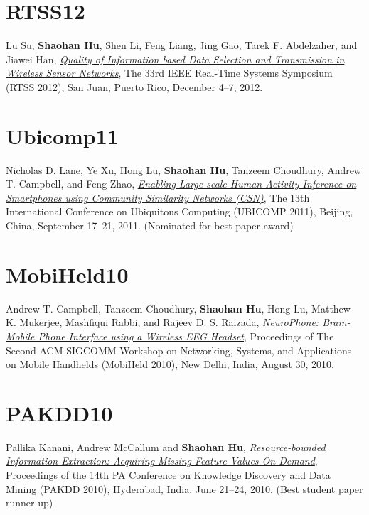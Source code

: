 \section{\sc RTSS12}\hypertarget{su2012rtss}{}
Lu Su, \textbf{Shaohan Hu}, Shen Li, Feng Liang, Jing Gao, Tarek
F. Abdelzaher, and Jiawei Han, \href{http://ieeexplore.ieee.org/xpl/articleDetails.jsp?arnumber=6424815}{\emph{Quality of Information based Data
  Selection and Transmission in Wireless Sensor Networks}}, \textsf{The
  33rd IEEE Real-Time Systems Symposium (RTSS 2012)}, San Juan, Puerto
Rico, December 4--7, 2012.

\section{\sc Ubicomp11}\hypertarget{lane2011ubicomp}{}
Nicholas D. Lane, Ye Xu, Hong Lu, \textbf{Shaohan Hu}, Tanzeem
Choudhury, Andrew T. Campbell, and Feng Zhao, \href{http://portal.acm.org/citation.cfm?id=2030160}{\emph{Enabling
  Large-scale Human Activity Inference on Smartphones using Community
  Similarity Networks (CSN)}}, \textsf{The 13th International
  Conference on Ubiquitous Computing (UBICOMP 2011)}, Beijing, China,
September 17--21, 2011. (Nominated for best paper award)

\section{\sc MobiHeld10}\hypertarget{campbell2010mobiheld}{}
Andrew T. Campbell, Tanzeem Choudhury, \textbf{Shaohan Hu}, Hong Lu,
Matthew K. Mukerjee, Mashfiqui Rabbi, and Rajeev D. S. Raizada,
\href{http://portal.acm.org/citation.cfm?id=1851326}{\emph{NeuroPhone: Brain-Mobile Phone Interface using a Wireless EEG
  Headset}}, \textsf{Proceedings of The Second ACM SIGCOMM Workshop on
  Networking, Systems, and Applications on Mobile Handhelds (MobiHeld
  2010)}, New Delhi, India, August 30, 2010.

\section{\sc PAKDD10}\hypertarget{kanani2010pakdd}{}
Pallika Kanani, Andrew McCallum and \textbf{Shaohan Hu},
\href{http://www.springerlink.com/content/j41w758434321108}{\emph{Resource-bounded Information Extraction: Acquiring Missing
  Feature Values On Demand}}, \textsf{Proceedings of the 14th PA
  Conference on Knowledge Discovery and Data Mining (PAKDD 2010)},
Hyderabad, India. June 21--24, 2010. (Best student paper runner-up)

